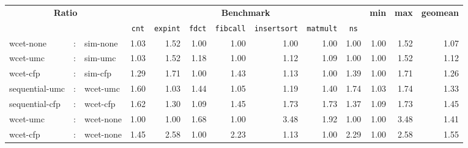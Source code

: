 
\begin{tabular}{|lll||r|r|r|r|r|r|r||r|r|r|}
\hline

\multicolumn{3}{|c||}{\multirow{2}{*}{\bf Ratio}}  &\multicolumn{7}{c||}{\bf Benchmark}      &\multicolumn{1}{c|}{\multirow{2}{*}{\bf min}}&\multicolumn{1}{c|}{\multirow{2}{*}{\bf max}}&\multicolumn{1}{c|}{\multirow{2}{*}{\bf geomean}} \\ \cline{4-10}
&&&\multicolumn{1}{c|}{\tt cnt}&\multicolumn{1}{c|}{\tt expint}&\multicolumn{1}{c|}{\tt fdct}&\multicolumn{1}{c|}{\tt fibcall}&\multicolumn{1}{c|}{\tt insertsort}&\multicolumn{1}{c|}{\tt matmult}&\multicolumn{1}{c||}{\tt ns}&&& \\ \hline \hline
wcet-none&:&sim-none&1.03&1.52&1.00&1.00&1.00&1.00&1.00&1.00&1.52&1.07 \\ \hline
wcet-umc&:&sim-umc&1.03&1.52&1.18&1.00&1.12&1.09&1.00&1.00&1.52&1.12 \\ \hline
wcet-cfp&:&sim-cfp&1.29&1.71&1.00&1.43&1.13&1.00&1.39&1.00&1.71&1.26 \\ \hline \hline
sequential-umc&:&wcet-umc&1.60&1.03&1.44&1.05&1.19&1.40&1.74&1.03&1.74&1.33 \\ \hline
sequential-cfp&:&wcet-cfp&1.62&1.30&1.09&1.45&1.73&1.73&1.37&1.09&1.73&1.45 \\ \hline \hline
wcet-umc&:&wcet-none&1.00&1.00&1.68&1.00&3.48&1.92&1.00&1.00&3.48&1.41 \\ \hline
wcet-cfp&:&wcet-none&1.45&2.58&1.00&2.23&1.13&1.00&2.29&1.00&2.58&1.55 \\ \hline

\end{tabular}
